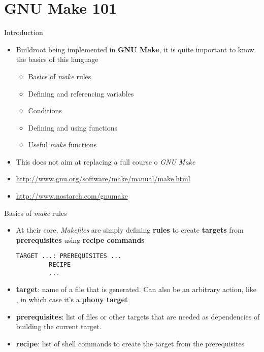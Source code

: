 \section{GNU Make 101}

\begin{frame}{Introduction}
  \begin{itemize}
  \item Buildroot being implemented in {\bf GNU Make}, it is quite
    important to know the basics of this language
    \begin{itemize}
    \item Basics of {\em make} rules
    \item Defining and referencing variables
    \item Conditions
    \item Defining and using functions
    \item Useful {\em make} functions
    \end{itemize}
  \item This does not aim at replacing a full course o {\em GNU Make}
  \item \url{http://www.gnu.org/software/make/manual/make.html}
  \item \url{http://www.nostarch.com/gnumake}
  \end{itemize}
\end{frame}

\begin{frame}[fragile]{Basics of {\em make} rules}
  \begin{itemize}
  \item At their core, {\em Makefiles} are simply defining {\bf rules}
    to create {\bf targets} from {\bf prerequisites} using {\bf recipe
      commands}
    \begin{block}{}
\begin{verbatim}
TARGET ...: PREREQUISITES ...
         RECIPE
         ...
\end{verbatim}
    \end{block}
  \item {\bf target}: name of a file that is generated. Can also be an
    arbitrary action, like , in which case it's a {\bf
      phony target}
  \item {\bf prerequisites}: list of files or other targets that are
    needed as dependencies of building the current target.
  \item {\bf recipe}: list of shell commands to create the target from
    the prerequisites
  \end{itemize}
\end{frame}

